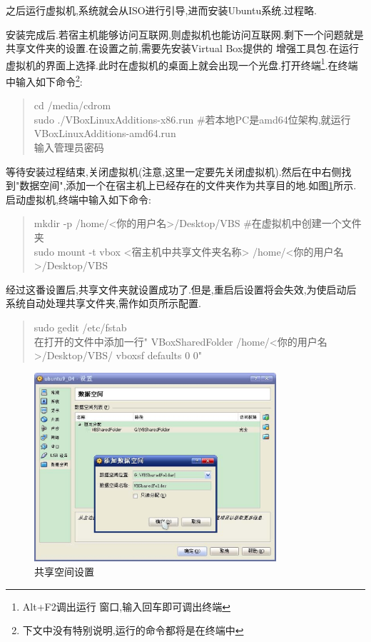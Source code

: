 \documentclass[12pt,a4paper,titlepage]{article}
\begin{document}
之后运行虚拟机,系统就会从ISO进行引导,进而安装Ubuntu系统.过程略.

安装完成后.若宿主机能够访问互联网,则虚拟机也能访问互联网.剩下一个问题就是共享文件夹的设置.在设置之前,需要先安装Virtual Box提供的
增强工具包.在运行虚拟机的界面上选择.此时在虚拟机的桌面上就会出现一个光盘.打开终端\footnote{Alt+F2调出运行
窗口,输入回车即可调出终端}.在终端中输入如下命令\footnote{下文中没有特别说明,运行的命令都将是在终端中}:
\begin{verse}
cd /media/cdrom\\sudo ./VBoxLinuxAdditions-x86.run \#若本地PC是amd64位架构,就运行VBoxLinuxAdditions-amd64.run\\输入管理员密码
\end{verse}
等待安装过程结束,关闭虚拟机{(注意,这里一定要先关闭虚拟机)}.然后在中右侧找到"数据空间",添加一个在宿主机上已经存在的文件夹作为共享目的地.如图\ref{f_sf}所示.
启动虚拟机,终端中输入如下命令:
\begin{verse}
mkdir -p /home/<你的用户名>/Desktop/VBS \#在虚拟机中创建一个文件夹\\sudo mount -t vbox <宿主机中共享文件夹名称> 
/home/<你的用户名>/Desktop/VBS
\end{verse}
经过这番设置后,共享文件夹就设置成功了.但是,重启后设置将会失效,为使启动后系统自动处理共享文件夹,需作如\pageref{cmd0}页所示配置.
\begin{verse}\label{cmd0}
sudo gedit /etc/fstab\\在打开的文件中添加一行" VBoxSharedFolder  /home/<你的用户名>/Desktop/VBS/  vboxsf  defaults 0 0"
\end{verse}
\begin{figure}[!bthp]
\centering
\includegraphics[width=0.8\textwidth,scale=0.8]{pic/f_vb_setting_sf.eps}
\caption{共享空间设置\label{f_sf}}
\end{figure}
\end{document}
